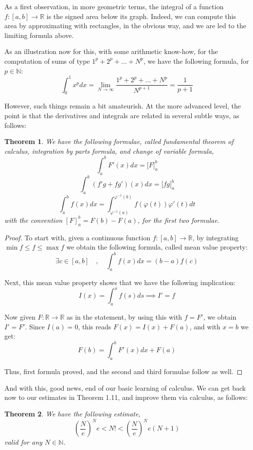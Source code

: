 \documentclass[12pt]{amsbook}
\newtheorem{theorem}{Theorem}[chapter]
\begin{document}
As a first observation, in more geometric terms, the integral of a function $f:[a,b]\to\mathbb R$ is the signed area below its graph. Indeed, we can compute this area by approximating with rectangles, in the obvious way, and we are led to the limiting formula above. 

\bigskip

As an illustration now for this, with some arithmetic know-how, for the computation of sums of type $1^p+2^p+\ldots+N^p$, we have the following formula, for $p\in\mathbb N$:
$$\int_0^1x^pdx=
\lim_{N\to\infty}\frac{1^p+2^p+\ldots+N^p}{N^{p+1}}=\frac{1}{p+1}$$

However, such things remain a bit amateurish. At the more advanced level, the point is that the derivatives and integrals are related in several subtle ways, as follows:


\begin{theorem}
We have the following formulae, called fundamental theorem of calculus, integration by parts formula, and change of variable formula,
$$\int_a^bF'(x)dx=\Big[F\Big]_a^b$$
$$\int_a^b(f'g+fg')(x)dx=\Big[fg\Big]_a^b$$
$$\int_a^bf(x)dx=\int_{\varphi^{-1}(a)}^{\varphi^{-1}(b)}f(\varphi(t))\varphi'(t)dt$$
with the convention $[F]_a^b=F(b)-F(a)$, for the first two formulae.
\end{theorem}

\begin{proof}
To start with, given a continuous function $f:[a,b]\to\mathbb R$, by integrating $\min f\leq f\leq \max f$ we obtain the following formula, called mean value property:
$$\exists c\in[a,b]\quad,\quad \int_a^bf(x)dx=(b-a)f(c)$$

Next, this mean value property shows that we have the following implication:
$$I(x)=\int_a^xf(s)ds\implies I'=f$$

Now given $F:\mathbb R\to\mathbb R$ as in the statement, by using this with $f=F'$, we obtain $I'=F'$. Since $I(a)=0$, this reads $F(x)=I(x)+F(a)$, and with $x=b$ we get:
$$F(b)=\int_a^bF'(x)dx+F(a)$$

Thus, first formula proved, and the second and third formulae follow as well.
\end{proof}

And with this, good news, end of our basic learning of calculus. We can get back now to our estimates in Theorem 1.11, and improve them via calculus, as follows:

\begin{theorem}
We have the following estimate,
$$\left(\frac{N}{e}\right)^Ne<N!<\left(\frac{N}{e}\right)^Ne(N+1)$$
valid for any $N\in\mathbb N$.
\end{theorem}
\end{document}
